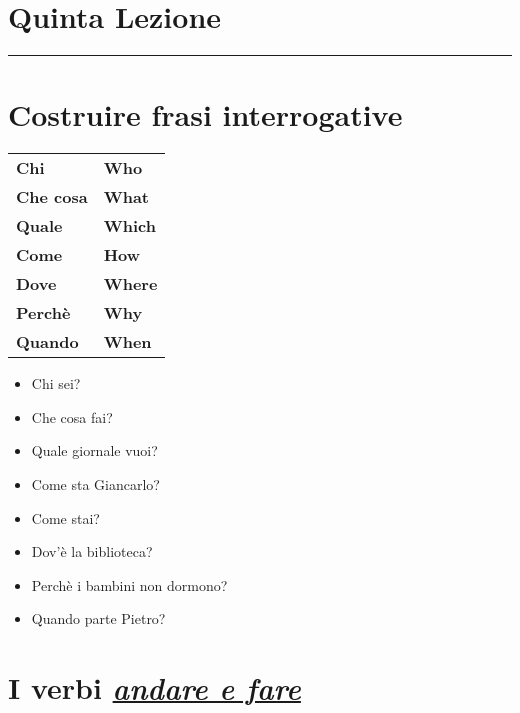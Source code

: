 \documentclass[letter,11pt]{article}
\begin{document}
\section*{\Large{Quinta Lezione}}
\noindent\rule{16cm}{1pt}

\setlength{\parindent}{260pt}

\vskip 0.2in
\section*{Costruire frasi interrogative}
\vskip 0.2in

\begin{tabular}{ |p{3cm}| p{3cm}| }

    \hline
    \hline
      &   \\ \hline
    {\bf Chi}   & {\bf Who}    \\ \hline
    {\bf Che cosa}    & {\bf What}       \\ \hline
    {\bf Quale} & {\bf Which}  \\ \hline
    {\bf Come}   & {\bf How}    \\ \hline
    {\bf Dove}    & {\bf Where}       \\ \hline
    {\bf Perchè} & {\bf Why}  \\ \hline
    {\bf Quando} & {\bf When}  \\ \hline
    \hline
\end{tabular}

\begin{multicols}{2}
\begin{itemize}
    \item Chi sei?
    \item Che cosa fai?
    \item Quale giornale vuoi?
    \item Come sta Giancarlo?
    \item Come stai?
    \item Dov'è la biblioteca?
    \item Perchè i bambini non dormono?
    \item Quando parte Pietro?



\end{itemize}
\end{multicols}
\vskip 0.2in


\vskip 0.2in
\section*{I verbi \underline{\emph{andare e fare}}}
\vskip 0.2in
\end{document}
